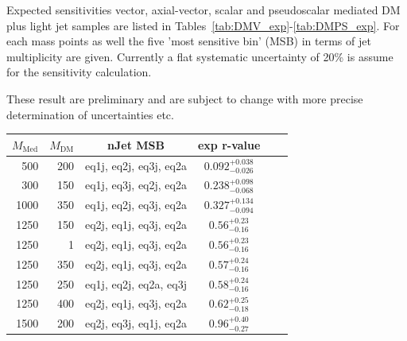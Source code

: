 \clearpage


Expected sensitivities vector, axial-vector, scalar and pseudoscalar mediated DM plus light jet samples are listed in Tables~\ref{tab:DMV_exp}-\ref{tab:DMPS_exp}. For each mass points as well the five 'most sensitive bin' (MSB) in terms of jet multiplicity are given. Currently a flat systematic uncertainty of 20\% is assume for the sensitivity calculation.

These result are preliminary and are subject to change with more precise determination of uncertainties etc.

\begin{table}
  \centering
  \begin{tabular}{rrcccc}
    \hline\hline
    $M_{\text{Med}}$ & $M_{\text{DM}}$ & nJet MSB & exp r-value \\
    \hline
      500 & 200 & eq1j, eq2j, eq3j, eq2a & $0.092_{-0.026}^{+0.038}$ \\ %
      300 & 150 & eq1j, eq3j, eq2j, eq2a & $0.238_{-0.068}^{+0.098}$ \\ %
     1000 & 350 & eq1j, eq2j, eq3j, eq2a & $0.327_{-0.094}^{+0.134}$ \\ %
     1250 & 150 & eq2j, eq1j, eq3j, eq2a & $0.56_{-0.16}^{+0.23}$    \\ %
     1250 &   1 & eq2j, eq1j, eq3j, eq2a & $0.56_{-0.16}^{+0.23}$    \\ %
     1250 & 350 & eq2j, eq1j, eq3j, eq2a & $0.57_{-0.16}^{+0.24}$    \\ %
     1250 & 250 & eq1j, eq2j, eq2a, eq3j & $0.58_{-0.16}^{+0.24}$    \\ %
     1250 & 400 & eq2j, eq1j, eq3j, eq2a & $0.62_{-0.18}^{+0.25}$    \\ %
     1500 & 200 & eq2j, eq3j, eq1j, eq2a & $0.96_{-0.27}^{+0.40}$    \\ %

\end{tabular}
\end{table}
